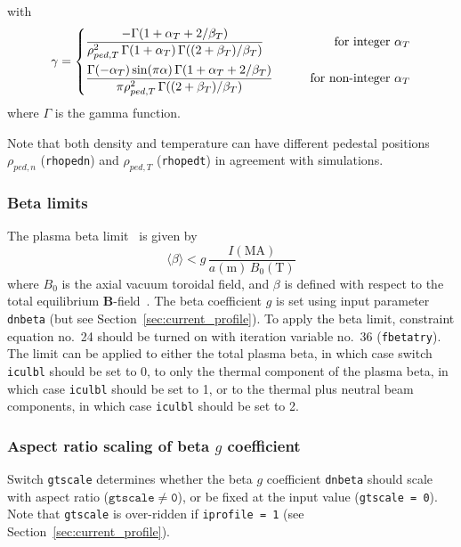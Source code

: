 \documentclass[11pt,a4paper]{report}
\begin{document}
with 
\begin{equation}
\gamma = \left\{ 
\begin{aligned}
  &\frac{ -\Gamma(1+\alpha_T+2/\beta_T)}
  {\rho_{ped,T}^2 \, \Gamma(1+\alpha_T) \, \Gamma((2+\beta_T)/\beta_T)}
  &\qquad \textnormal{for integer } \alpha_T \\
  &\frac{\Gamma(-\alpha_T)\sin(\pi\alpha)\, \Gamma(1+\alpha_T+2/\beta_T)}
  {\pi\rho_{ped,T}^2 \, \Gamma((2+\beta_T)/\beta_T)}
  &\qquad \textnormal{for non-integer } \alpha_T
\end{aligned}
\right.
\end{equation}
where $\Gamma$ is the gamma function.

Note that both density and temperature can have different pedestal positions
$\rho_{ped,n}$ (\texttt{rhopedn}) and $\rho_{ped,T}$ (\texttt{rhopedt}) in
agreement with simulations.

\subsubsection{Beta limits}

The plasma beta limit~\cite{IPDG,172} is given by
\begin{equation}
\langle \beta \rangle < g \, \frac{I(\mbox{MA})}{a(\mbox{m}) \, B_0(\mbox{T})}
\label{eqn:troyon}
\end{equation}
where $B_0$ is the axial vacuum toroidal field, and $\beta$ is defined with
respect to the total equilibrium $\mathbf{B}$-field~\cite{172}. The beta
coefficient $g$ is set using input parameter \texttt{dnbeta} (but see
Section~\ref{sec:current_profile}). To apply the beta limit, constraint
equation no.\ 24 should be turned on with iteration variable no.\ 36
(\texttt{fbetatry}). The limit can be applied to either the total plasma beta,
in which case switch \texttt{iculbl} should be set to 0, to only the thermal
component of the plasma beta, in which case \texttt{iculbl} should be set to
1, or to the thermal plus neutral beam components, in which case
\texttt{iculbl} should be set to 2.

\subsubsection*{Aspect ratio scaling of beta $g$ coefficient}

Switch \texttt{gtscale} determines whether the beta $g$ coefficient
\texttt{dnbeta} should scale with aspect ratio ($\mathtt{gtscale \not= 0}$),
or be fixed at the input value (\texttt{gtscale = 0}). Note that
\texttt{gtscale} is over-ridden if \texttt{iprofile = 1} (see
Section~\ref{sec:current_profile}).
\end{document}
